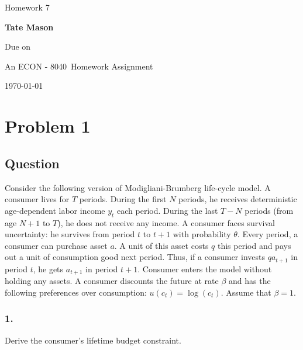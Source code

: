 \documentclass[10pt, a4paper]{article}
\newcommand\course{ECON - 8040}
\newcommand\hwnumber{7}
\newcommand\Information{Tate Mason}
\begin{document}
  \begin{titlepage}
    \begin{center}
      \vspace*{3cm}
            
      \vspace{1cm}
      \huge
      Homework \hwnumber
            
      \vspace{1.5cm}
      \Large
            
      \textbf{\Information}
            
      \vfill
      
      \vspace{1cm}
      
      Due on 

      \vspace{1cm}

      An \course \ Homework Assignment
            
      \vspace{1cm}
      \Large
      
      \today
            
    \end{center}
  \end{titlepage}
  \section*{Problem 1}
  \subsection*{Question}
    Consider the following version of Modigliani-Brumberg life-cycle model. A consumer lives for $T$ periods. During the first $N$ periods, he receives deterministic age-dependent labor income $y_t$ each period. During the last $T-N$ periods (from age $N+1$ to $T$), he does not receive any income. A consumer faces survival uncertainty: he survives from period $t$ to $t+1$ with probability $\theta$. Every period, a consumer can purchase asset $a$. A unit of this asset costs $q$ this period and pays out a unit of consumption good next period. Thus, if a consumer invests $qa_{t+1}$ in period $t$, he gets $a_{t+1}$ in period $t+1$. Consumer enters the model without holding any assets. A consumer discounts the future at rate $\beta$ and has the following preferences over consumption: $u(c_t) = \log(c_t)$. Assume that $\beta=1$.
    \subsubsection*{1.}
      Derive the consumer's lifetime budget constraint.
\end{document}
